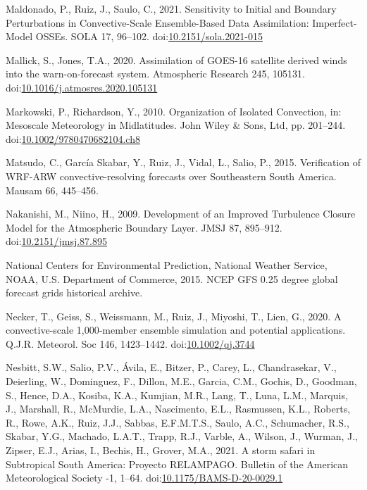 \documentclass[final,5p,times,twocolumn,authoryear]{elsarticle} %
\begin{document}
\leavevmode\hypertarget{ref-maldonado2021}{}%
Maldonado, P., Ruiz, J., Saulo, C., 2021. Sensitivity to Initial and Boundary Perturbations in Convective-Scale Ensemble-Based Data Assimilation: Imperfect-Model OSSEs. SOLA 17, 96--102. doi:\href{https://doi.org/10.2151/sola.2021-015}{10.2151/sola.2021-015}

\leavevmode\hypertarget{ref-mallick2020}{}%
Mallick, S., Jones, T.A., 2020. Assimilation of GOES-16 satellite derived winds into the warn-on-forecast system. Atmospheric Research 245, 105131. doi:\href{https://doi.org/10.1016/j.atmosres.2020.105131}{10.1016/j.atmosres.2020.105131}

\leavevmode\hypertarget{ref-markowski2010}{}%
Markowski, P., Richardson, Y., 2010. Organization of Isolated Convection, in: Mesoscale Meteorology in Midlatitudes. John Wiley \& Sons, Ltd, pp. 201--244. doi:\href{https://doi.org/10.1002/9780470682104.ch8}{10.1002/9780470682104.ch8}

\leavevmode\hypertarget{ref-matsudo2015}{}%
Matsudo, C., García Skabar, Y., Ruiz, J., Vidal, L., Salio, P., 2015. Verification of WRF-ARW convective-resolving forecasts over Southeastern South America. Mausam 66, 445--456.

\leavevmode\hypertarget{ref-nakanishi2009}{}%
Nakanishi, M., Niino, H., 2009. Development of an Improved Turbulence Closure Model for the Atmospheric Boundary Layer. JMSJ 87, 895--912. doi:\href{https://doi.org/10.2151/jmsj.87.895}{10.2151/jmsj.87.895}

\leavevmode\hypertarget{ref-cisl_rda_ds084.1}{}%
National Centers for Environmental Prediction, National Weather Service, NOAA, U.S. Department of Commerce, 2015. NCEP GFS 0.25 degree global forecast grids historical archive.

\leavevmode\hypertarget{ref-necker2020}{}%
Necker, T., Geiss, S., Weissmann, M., Ruiz, J., Miyoshi, T., Lien, G., 2020. A convective‐scale 1,000‐member ensemble simulation and potential applications. Q.J.R. Meteorol. Soc 146, 1423--1442. doi:\href{https://doi.org/10.1002/qj.3744}{10.1002/qj.3744}

\leavevmode\hypertarget{ref-nesbitt2021}{}%
Nesbitt, S.W., Salio, P.V., Ávila, E., Bitzer, P., Carey, L., Chandrasekar, V., Deierling, W., Dominguez, F., Dillon, M.E., Garcia, C.M., Gochis, D., Goodman, S., Hence, D.A., Kosiba, K.A., Kumjian, M.R., Lang, T., Luna, L.M., Marquis, J., Marshall, R., McMurdie, L.A., Nascimento, E.L., Rasmussen, K.L., Roberts, R., Rowe, A.K., Ruiz, J.J., Sabbas, E.F.M.T.S., Saulo, A.C., Schumacher, R.S., Skabar, Y.G., Machado, L.A.T., Trapp, R.J., Varble, A., Wilson, J., Wurman, J., Zipser, E.J., Arias, I., Bechis, H., Grover, M.A., 2021. A storm safari in Subtropical South America: Proyecto RELAMPAGO. Bulletin of the American Meteorological Society -1, 1--64. doi:\href{https://doi.org/10.1175/BAMS-D-20-0029.1}{10.1175/BAMS-D-20-0029.1}
\end{document}

